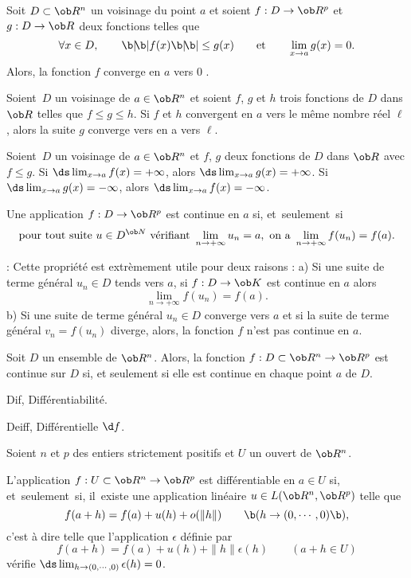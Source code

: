  
\Propriete []  Soit $D\subset\ob R^n$ un voisinage du point $a$ et soient $f:D\to\ob R^p$ et $g:D\to\ob R$ deux fonctions telles que 
$$
\forall x\in D, \qquad \b|\!\b|f(x)\b|\!\b|\le g(x)\qquad \mbox{et}\qquad \lim_{x\to a}g(x)=0.
$$
Alors, la fonction $f$ converge en $a$ vers $0$ . 

\Propriete [Title=Principe des gendarmes]
Soient~$D$ un voisinage de $a\in\ob R^n$ et soient $f$, $g$ et $h$ trois fonctions de $D$ dans $\ob R$ telles que $f\le g\le h$. Si $f$ et $h$ convergent en $a$ vers le même nombre réel $\ell$, alors la suite $g$ converge vers en a vers $\ell$. 


\Propriete [Title=Conservation des inégalités larges par passage à la limite]
Soient~$D$ un voisinage de $a\in\ob R^n$ 
et $f$, $g$ deux fonctions de $D$ dans $\ob R$ avec $f\le g$. \pn 
Si $\ds\lim_{x\to a}f(x)=+\infty$, alors $\ds\lim_{x\to a}g(x)=+\infty$. 
\pn
Si $\ds\lim_{x\to a}g(x)=-\infty$, alors $\ds\lim_{x\to a}f(x)=-\infty$. 
 
\Theoreme [$D$ voisinage de $a\in\ob R^n$]
Une application $f:D\to\ob R^p$ est continue en $a$ si, et~seulement~si 
$$
\mbox{pour tout suite }u\in D^{\ob N} \mbox{ vérifiant }\lim_{n\to+\infty}u_n=a, \mbox{ on a }\lim_{n\to+\infty}f(u_n)=f(a). 
$$

\Remarque : Cette propriété est extrèmement utile pour deux raisons : \pn
a) Si une suite de terme général $u_n\in D$ tends vers $a$, si $f:D\to\ob K$ est continue en $a$ 
alors 
$$
\lim_{n\to+\infty}f(u_n)=f(a).
$$
b) Si une suite de terme général $u_n\in D$ converge vers $a$ et si la suite de terme général $v_n=f(u_n)$ diverge, alors, la fonction $f$ n'est pas continue en $a$. 
\bigskip


\Definition []  Soit $D$ un ensemble de $\ob R^n$. Alors, la fonction $f:D\subset\ob R^n\to\ob R^p$ est continue sur $D$ si, et seulement si elle est continue en chaque point $a$ de $D$. 
\bigskip


\Section Dif, Différentiabilité.
\bigskip

\Subsection Deiff, Différentielle $\d f$. 

\noindent
Soient $n$ et $p$ des entiers strictement positifs et $U$ un ouvert de $\ob R^n$. 
\bigskip

\Definition []  L'application $f:U\subset \ob R^n\to\ob R^p$ 
est différentiable en $a\in U$ si, et~seulement~si, il~existe 
une application linéaire $u\in\sc L(\ob R^n,\ob R^p)$ telle que 
$$
f(a+h)=f(a)+u(h)+o(\|h\|)\qquad\b(h\to(0,\cdots,0)\b), 
$$
c'est à dire telle que l'application $\epsilon$ définie par 
$$
f(a+h)=f(a)+u(h)+\|h\|\epsilon(h)\qquad(a+h\in U)
$$ 
vérifie $\ds\lim_{h\to (0,\cdots,0)}\epsilon(h)=0$. 
\bigskip

